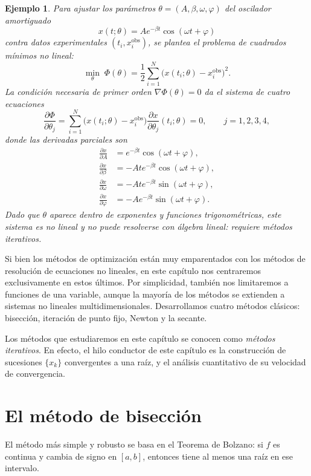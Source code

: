\documentclass[a4paper,11pt]{report}
\newtheorem{example}[theorem]{Ejemplo}
\begin{document}
\begin{example}
Para ajustar los parámetros $\theta=(A,\beta,\omega,\varphi)$ del oscilador amortiguado
\[
x(t;\theta)=Ae^{-\beta t}\cos(\omega t+\varphi)
\]
contra datos experimentales $(t_i,x_i^{\mathrm{obs}})$, se plantea el problema de
cuadrados mínimos no lineal:
\[
\min_{\theta}\;\Phi(\theta)=\frac{1}{2}\sum_{i=1}^N\bigl(x(t_i;\theta)-x_i^{\mathrm{obs}}\bigr)^2.
\]
La condición necesaria de primer orden $\nabla\Phi(\theta)=0$ da el sistema de cuatro ecuaciones
\[
\frac{\partial\Phi}{\partial\theta_j}=\sum_{i=1}^N\bigl(x(t_i;\theta)-x_i^{\mathrm{obs}}\bigr)
\frac{\partial x}{\partial\theta_j}(t_i;\theta)=0,\qquad j=1,2,3,4,
\]
donde las derivadas parciales son
\begin{align*}
\frac{\partial x}{\partial A}&=e^{-\beta t}\cos(\omega t+\varphi),\\
\frac{\partial x}{\partial \beta}&=-Ate^{-\beta t}\cos(\omega t+\varphi),\\
\frac{\partial x}{\partial \omega}&=-Ate^{-\beta t}\sin(\omega t+\varphi),\\
\frac{\partial x}{\partial \varphi}&=-Ae^{-\beta t}\sin(\omega t+\varphi).
\end{align*}
Dado que $\theta$ aparece dentro de exponentes y funciones trigonométricas, este sistema
es no lineal y no puede resolverse con álgebra lineal: requiere métodos iterativos.
\end{example}


Si bien los métodos de optimización están muy emparentados con los métodos de resolución de ecuaciones no lineales, en este capítulo nos centraremos exclusivamente en estos últimos. Por simplicidad, también nos limitaremos a funciones de una variable, aunque la mayoría de los métodos se extienden a sistemas no lineales multidimensionales. Desarrollamos cuatro métodos clásicos: bisección, iteración de punto fijo, Newton y la secante.

Los métodos que estudiaremos en este capítulo se conocen como \textit{métodos iterativos}. En efecto, el hilo conductor de este capítulo es la construcción de sucesiones $\{x_k\}$ convergentes a una raíz, y el análisis cuantitativo de su velocidad de convergencia.

\section{El método de bisección}
\label{sec:biseccion}

El método más simple y robusto se basa en el Teorema de Bolzano: si $f$ es continua
y cambia de signo en $[a,b]$, entonces tiene al menos una raíz en ese intervalo.
\end{document}
